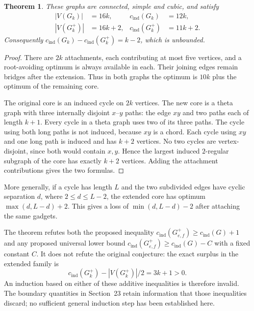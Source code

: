 \documentclass[11pt]{article}
\newtheorem{theorem}{Theorem}[section]
\newcommand{\cind}{c_{\mathrm{ind}}}
\begin{document}
\begin{theorem}\label{thm:unbounded-extension-loss}
These graphs are connected, simple and cubic, and satisfy
\begin{align*}
 |V(G_k)|&=16k,&\cind(G_k)&=12k,\\
 |V(G_k^+)|&=16k+2,&\cind(G_k^+)&=11k+2.
\end{align*}
Consequently $\cind(G_k)-\cind(G_k^+)=k-2$, which is unbounded.
\end{theorem}
\begin{proof}
There are $2k$ attachments, each contributing at most five vertices,
and a root-avoiding optimum is always available in each. Their joining
edges remain bridges after the extension. Thus in both graphs the
optimum is $10k$ plus the optimum of the remaining core.

The original core is an induced cycle on $2k$ vertices. The new core
is a theta graph with three internally disjoint $x$--$y$ paths: the
edge $xy$ and two paths each of length $k+1$. Every cycle in a theta
graph uses two of its three paths. The cycle using both long paths
is not induced, because $xy$ is a chord. Each cycle using $xy$ and
one long path is induced and has $k+2$ vertices. No two cycles are
vertex-disjoint, since both would contain $x,y$. Hence the largest
induced $2$-regular subgraph of the core has exactly $k+2$ vertices.
Adding the attachment contributions gives the two formulas.
\end{proof}

More generally, if a cycle has length $L$ and the two subdivided
edges have cyclic separation $d$, where $2\leq d\leq L-2$, the
extended core has optimum $\max(d,L-d)+2$. This gives a loss of
$\min(d,L-d)-2$ after attaching the same gadgets.

The theorem refutes both the proposed inequality
$\cind(G_{e,f}^+)\geq\cind(G)+1$ and any proposed universal lower
bound $\cind(G_{e,f}^+)\geq\cind(G)-C$ with a fixed constant $C$.
It does not refute the original conjecture: the exact surplus in the
extended family is
\[
 \cind(G_k^+)-|V(G_k^+)|/2=3k+1>0.
\]
An induction based on either of these additive inequalities is therefore
invalid. The boundary quantities in Section~23 retain information that
those inequalities discard; no sufficient general induction step has
been established here.
\end{document}
